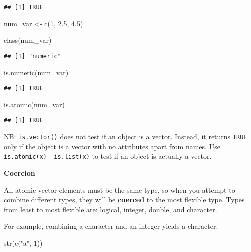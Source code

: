 \documentclass[
]{book}
\newenvironment{Shaded}{\begin{snugshade}}{\end{snugshade}}
\newcommand{\DecValTok}[1]{\textcolor[rgb]{0.00,0.00,0.81}{#1}}
\newcommand{\FloatTok}[1]{\textcolor[rgb]{0.00,0.00,0.81}{#1}}
\newcommand{\FunctionTok}[1]{\textcolor[rgb]{0.00,0.00,0.00}{#1}}
\newcommand{\NormalTok}[1]{#1}
\newcommand{\OtherTok}[1]{\textcolor[rgb]{0.56,0.35,0.01}{#1}}
\newcommand{\StringTok}[1]{\textcolor[rgb]{0.31,0.60,0.02}{#1}}
\begin{document}
\begin{verbatim}
## [1] TRUE
\end{verbatim}

\begin{Shaded}
\begin{Highlighting}[]
\NormalTok{num\_var }\OtherTok{\textless{}{-}} \FunctionTok{c}\NormalTok{(}\DecValTok{1}\NormalTok{, }\FloatTok{2.5}\NormalTok{, }\FloatTok{4.5}\NormalTok{)}

\FunctionTok{class}\NormalTok{(num\_var)}
\end{Highlighting}
\end{Shaded}

\begin{verbatim}
## [1] "numeric"
\end{verbatim}

\begin{Shaded}
\begin{Highlighting}[]
\FunctionTok{is.numeric}\NormalTok{(num\_var)}
\end{Highlighting}
\end{Shaded}

\begin{verbatim}
## [1] TRUE
\end{verbatim}

\begin{Shaded}
\begin{Highlighting}[]
\FunctionTok{is.atomic}\NormalTok{(num\_var)}
\end{Highlighting}
\end{Shaded}

\begin{verbatim}
## [1] TRUE
\end{verbatim}

NB: \texttt{is.vector()} does not test if an object is a vector. Instead, it returns \texttt{TRUE} only if the object is a vector with no attributes apart from names. Use \texttt{is.atomic(x)\ \textbar{}\textbar{}\ is.list(x)} to test if an object is actually a vector.

\textbf{Coercion}

All atomic vector elements must be the same type, so when you attempt to combine different types, they will be \textbf{coerced} to the most flexible type. Types from least to most flexible are: logical, integer, double, and character.

For example, combining a character and an integer yields a character:

\begin{Shaded}
\begin{Highlighting}[]
\FunctionTok{str}\NormalTok{(}\FunctionTok{c}\NormalTok{(}\StringTok{"a"}\NormalTok{, }\DecValTok{1}\NormalTok{))}
\end{Highlighting}
\end{Shaded}
\end{document}
